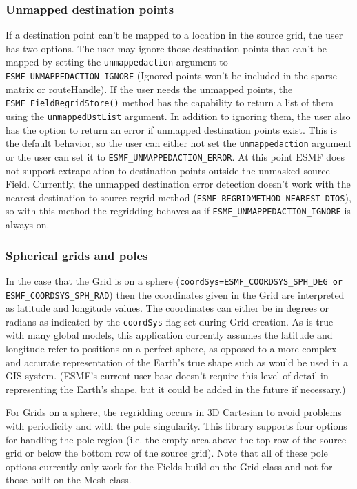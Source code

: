 \subsubsection{Unmapped destination points}
 If a destination point can't be mapped to a location in the source grid, the user has two options. The user may ignore those destination points
 that can't be mapped by setting the {\tt unmappedaction} argument to {\tt ESMF\_UNMAPPEDACTION\_IGNORE} (Ignored points won't be included in
 the sparse matrix or routeHandle). If the user needs the unmapped points, the {\tt ESMF\_FieldRegridStore()} method has the capability to return
 a list of them using the {\tt unmappedDstList} argument.  In addition to ignoring them, the user also has the option to return
 an error if unmapped destination points exist. This is the default behavior, so the user can either not set the {\tt unmappedaction} argument
 or the user can set it to {\tt ESMF\_UNMAPPEDACTION\_ERROR}. At this point ESMF does not support extrapolation to destination points outside 
 the unmasked source Field. Currently, the unmapped destination error detection doesn't work with the nearest destination to source regrid method
({\tt ESMF\_REGRIDMETHOD\_NEAREST\_DTOS}), so with this method the regridding behaves as if {\tt ESMF\_UNMAPPEDACTION\_IGNORE} is always on. 

\subsubsection{Spherical grids and poles}
In the case that the Grid is on a sphere ({\tt coordSys=ESMF\_COORDSYS\_SPH\_DEG or ESMF\_COORDSYS\_SPH\_RAD})
then the coordinates given in the Grid are interpreted as latitude and longitude values. The coordinates can either be in degrees or radians as indicated by the 
{\tt coordSys} flag set during Grid creation. As is true with many global models, this application currently assumes the latitude and longitude refer to positions on a 
perfect sphere, as opposed to a more complex and accurate representation of the Earth's true shape such as would be used in a GIS system. (ESMF's current user base doesn't 
require this level of detail in representing the Earth's shape, but it could be added in the future if necessary.)

For Grids on a sphere, the regridding occurs in 3D Cartesian to avoid
problems with periodicity and with the pole singularity. This library
 supports four options for handling the pole region (i.e. the empty area above the top row of the source grid or below
 the bottom row of the source grid).  Note that all of these pole options currently only work for the Fields build on the Grid class and not for those built on 
 the Mesh class. 


